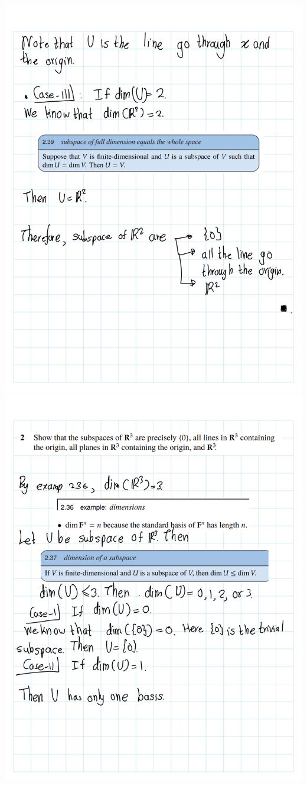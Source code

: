 \documentclass[
]{book}
\theoremstyle{definition}
\theoremstyle{definition}
\theoremstyle{definition}
\theoremstyle{definition}
\theoremstyle{remark}
\begin{document}
\includegraphics{fig/Ex 2B and 2C/Ex 2c (4).png}
\includegraphics{fig/Ex 2B and 2C/Ex 2c (5).png}
\end{document}
